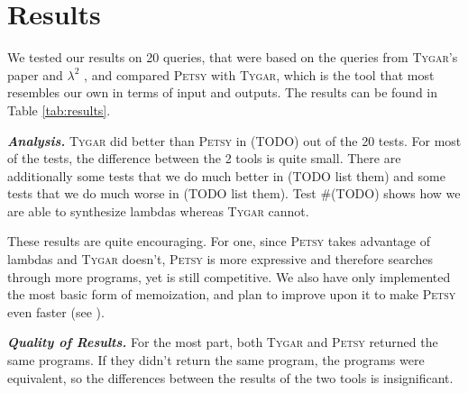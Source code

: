 \documentclass[acmsmall,nonacm]{acmart}
\begin{document}







\section{Results}




We tested our results on 20 queries, that were based on the queries 
from \textsc{Tygar}'s \cite{tygar} paper and ${\lambda^2}$ \cite{lambda2}, and 
compared \textsc{Petsy} with \textsc{Tygar}, 
which is the tool that most resembles our own in terms of input and outputs. 
The results can be found in Table \ref{tab:results}.


\vspace{2mm}
\noindent \textbf{\textit{Analysis.}} 
\textsc{Tygar} did better than \textsc{Petsy} in (TODO) out of the 20 tests. 
For most of the tests, the difference between the 2 tools is quite small. There
are additionally some tests that we do much better in (TODO list them)
and some tests that we do much worse in (TODO list them).
Test \#(TODO) shows how we are able to synthesize lambdas whereas \textsc{Tygar} cannot.

These results are quite encouraging. For one, since \textsc{Petsy} takes advantage of 
lambdas and \textsc{Tygar} doesn't, \textsc{Petsy} is more expressive and therefore searches through 
more programs, yet is still competitive. We also have only implemented the most
basic form of memoization, and plan to improve upon it to make \textsc{Petsy} even
faster (see ).

\vspace{2mm}
\noindent \textbf{\textit{Quality of Results.}} For the most part, both \textsc{Tygar} 
and \textsc{Petsy} returned the same programs. If they didn't return the same program,
the programs were equivalent, so the differences between the results of the two
tools is insignificant. 
\end{document}
